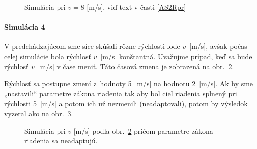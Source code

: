 \documentclass[a4paper, 10pt, ]{article}
\begin{document}
\begin{figure}[t]
	\centering



	\caption{Simulácia pri $v = 8$ [m/s], viď text v časti \ref{AS2Rpr}}
	\label{fig_tex_03_5}

\end{figure}












\begin{figure}[!b]
	\centering

	\vspace{-2mm}


	\caption{}
	\label{figsc_ar04_fig_as2r_v_3}

	\vspace{-2mm}

\end{figure}



\paragraph{Simulácia 4}

V predchádzajúcom sme síce skúšali rôzne rýchlosti lode $v$~[m/s], avšak počas celej simulácie bola rýchlosť $v$~[m/s] konštantná. Uvažujme prípad, keď sa bude rýchlosť $v$~[m/s] v čase meniť. Táto časová zmena je zobrazená na obr.~\ref{figsc_ar04_fig_as2r_v_3}.

Rýchlosť sa postupne zmení z~hodnoty 5~[m/s] na hodnotu 2~[m/s]. Ak by sme „nastavili“ parametre zákona riadenia tak aby bol cieľ riadenia splnený pri rýchlosti 5~[m/s] a potom ich už nezmenili (neadaptovali), potom by výsledok vyzeral ako na obr.~\ref{figsc_ar04_fig_as2r_yu_3}.




\begin{figure}[t]
	\centering



	\caption{Simulácia pri $v$ [m/s] podľa obr.~\ref{figsc_ar04_fig_as2r_v_3} pričom parametre zákona riadenia sa neadaptujú.}
	\label{figsc_ar04_fig_as2r_yu_3}

\end{figure}
\end{document}

